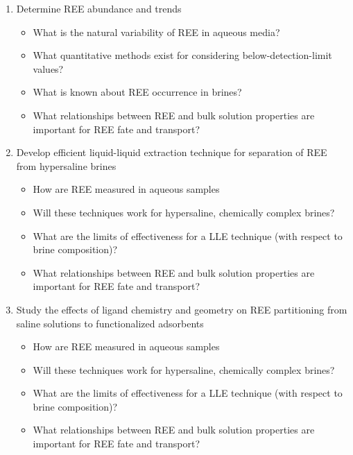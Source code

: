 \begin{enumerate}
\item Determine REE abundance and trends
	\begin{itemize}
		\item What is the natural variability of REE in aqueous media?
		\item What quantitative methods exist for considering below-detection-limit values?
		\item What is known about REE occurrence in brines?
		\item What relationships between REE and bulk solution properties are important for REE fate and transport?
	\end{itemize}
\item Develop efficient liquid-liquid extraction technique for separation of REE from hypersaline brines
	\begin{itemize}
		\item How are REE measured in aqueous samples
		\item Will these techniques work for hypersaline, chemically complex brines?
		\item What are the limits of effectiveness for a LLE technique (with respect to brine composition)?
		\item What relationships between REE and bulk solution properties are important for REE fate and transport?
	\end{itemize}
\item Study the effects of ligand chemistry and geometry on REE partitioning from saline solutions to functionalized adsorbents
	\begin{itemize}
		\item How are REE measured in aqueous samples
		\item Will these techniques work for hypersaline, chemically complex brines?
		\item What are the limits of effectiveness for a LLE technique (with respect to brine composition)?
		\item What relationships between REE and bulk solution properties are important for REE fate and transport?
	\end{itemize}
\end{enumerate}



